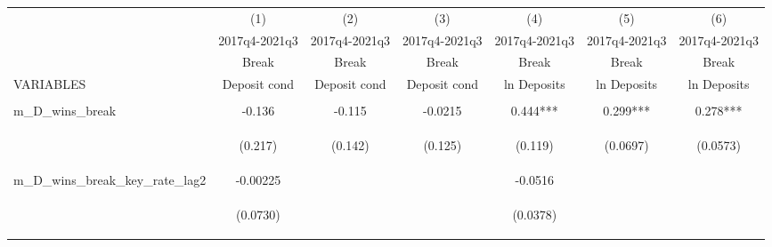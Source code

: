 \documentclass[]{article}
\begin{document}
\begin{center}
\begin{tabular}{lcccccc} \hline
 & (1) & (2) & (3) & (4) & (5) & (6) \\
 & 2017q4-2021q3 & 2017q4-2021q3 & 2017q4-2021q3 & 2017q4-2021q3 & 2017q4-2021q3 & 2017q4-2021q3 \\
 & Break & Break & Break & Break & Break & Break \\
VARIABLES & Deposit cond & Deposit cond & Deposit cond & ln Deposits & ln Deposits & ln Deposits \\ \hline
\vspace{4pt} & \begin{footnotesize}\end{footnotesize} & \begin{footnotesize}\end{footnotesize} & \begin{footnotesize}\end{footnotesize} & \begin{footnotesize}\end{footnotesize} & \begin{footnotesize}\end{footnotesize} & \begin{footnotesize}\end{footnotesize} \\
m\_D\_wins\_break & -0.136 & -0.115 & -0.0215 & 0.444*** & 0.299*** & 0.278*** \\
\vspace{4pt} & \begin{footnotesize}(0.217)\end{footnotesize} & \begin{footnotesize}(0.142)\end{footnotesize} & \begin{footnotesize}(0.125)\end{footnotesize} & \begin{footnotesize}(0.119)\end{footnotesize} & \begin{footnotesize}(0.0697)\end{footnotesize} & \begin{footnotesize}(0.0573)\end{footnotesize} \\
m\_D\_wins\_break\_key\_rate\_lag2 & -0.00225 &  &  & -0.0516 &  &  \\
\vspace{4pt} & \begin{footnotesize}(0.0730)\end{footnotesize} & \begin{footnotesize}\end{footnotesize} & \begin{footnotesize}\end{footnotesize} & \begin{footnotesize}(0.0378)\end{footnotesize} & \begin{footnotesize}\end{footnotesize} & \begin{footnotesize}\end{footnotesize} \\

\end{tabular}
\end{center}
\end{document}
